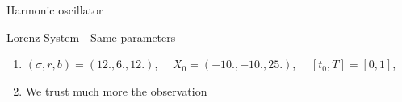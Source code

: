 \begin{frame}{Harmonic oscillator}
\begin{minipage}{.32\linewidth}
       \end{minipage}
       
   \end{frame}
   \begin{frame}{Lorenz System - Same parameters}
    \begin{enumerate}[\textbullet]
        \item $(\sigma, r, b)=(12.,6.,12.)$, $\quad X_0=(-10.,-10.,25.)$, $\quad [t_0,T]=[0,1]$,
        \item We trust much more the observation
        \end{enumerate}
       
    \end{frame}
